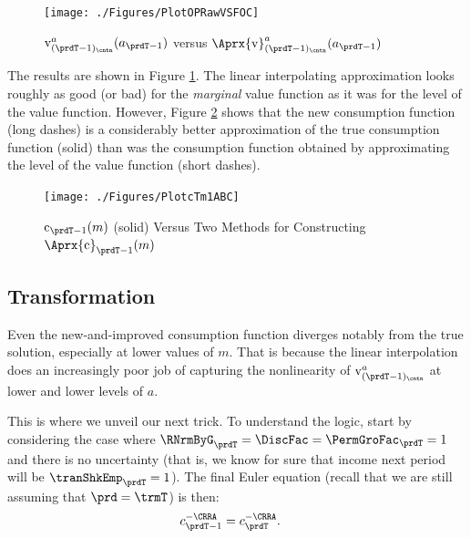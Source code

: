 \documentclass[titlepage, headings=optiontotocandhead]{econtex}
\begin{document}
\hypertarget{PlotOPRawVSFOC}{}
\begin{figure}
  \centerline{\texttt{[image: ./Figures/PlotOPRawVSFOC]}}
  \caption{$\mathrm{v}_{(\prdT-1)_\cntn}^{a}(a_{\prdT-1})$ versus $\Aprx{\mathrm{v}}_{(\prdT-1)_\cntn}^{a}(a_{\prdT-1})$}
  \label{fig:PlotOPRawVSFOC}
\end{figure}


The results are shown in Figure \ref{fig:PlotOPRawVSFOC}.  The linear interpolating approximation looks roughly as good (or bad) for the \textit{marginal} value function as it was for the level of the value function. However, Figure \ref{fig:PlotcTm1ABC} shows that the new consumption function (long dashes) is a considerably better approximation of the true consumption function (solid) than was the consumption function obtained by approximating the level of the value function (short dashes).

\hypertarget{PlotcTm1ABC}{}
\begin{figure}
  \centerline{\texttt{[image: ./Figures/PlotcTm1ABC]}}
  \caption{$\mathrm{c}_{\prdT-1}(m)$ (solid) Versus Two Methods for Constructing $\Aprx{\mathrm{c}}_{\prdT-1}(m)$}
  \label{fig:PlotcTm1ABC}
\end{figure}

\hypertarget{transformation}{}
\subsection{Transformation}\label{subsec:transformation}

Even the new-and-improved consumption function diverges notably from the true solution, especially at lower values of $m$.  That is because the linear interpolation does an increasingly poor job of capturing the nonlinearity of $\mathrm{v}_{(\prdT-1)_\cntn}^{a}$ at lower and lower levels of $a$.

This is where we unveil our next trick.  To understand the logic, start by considering the case where $\RNrmByG_{\prdT} = \DiscFac = \PermGroFac_{\prdT} = 1$ and there is no uncertainty (that is, we know for sure that income next period will be $\tranShkEmp_{\prdT} = 1$).  The final Euler equation (recall that we are still assuming that $\prd=\trmT$) is then:
\begin{equation}\begin{gathered}\begin{aligned}
      c_{\prdT-1}^{-\CRRA}  & = c_{\prdT}^{-\CRRA}.
    \end{aligned}\end{gathered}\end{equation}
\end{document}

